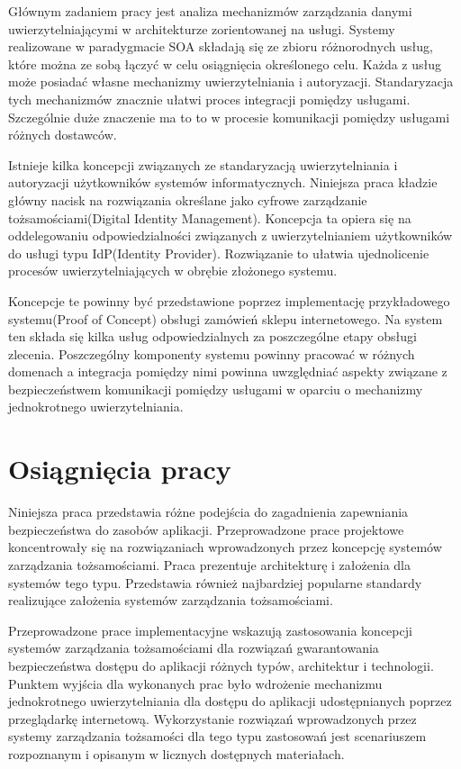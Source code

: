 	Głównym zadaniem pracy jest analiza mechanizmów zarządzania danymi uwierzytelniającymi w architekturze zorientowanej na usługi. Systemy realizowane w paradygmacie SOA składają się ze zbioru różnorodnych usług, które można ze sobą łączyć w celu osiągnięcia określonego celu. Każda z usług może posiadać własne mechanizmy uwierzytelniania i autoryzacji. Standaryzacja tych mechanizmów znacznie ułatwi proces integracji pomiędzy usługami. Szczególnie duże znaczenie ma to to w procesie komunikacji pomiędzy usługami różnych dostawców. 

	Istnieje kilka koncepcji związanych ze standaryzacją uwierzytelniania i autoryzacji użytkowników systemów informatycznych. Niniejsza praca kładzie główny nacisk na rozwiązania określane jako cyfrowe zarządzanie tożsamościami(Digital Identity Management). Koncepcja ta opiera się na oddelegowaniu odpowiedzialności związanych z uwierzytelnianiem użytkowników do usługi typu IdP(Identity Provider). Rozwiązanie to ułatwia ujednolicenie procesów uwierzytelniających w obrębie złożonego systemu.

	Koncepcje te powinny być przedstawione poprzez implementację przykładowego systemu(Proof of Concept) obsługi zamówień sklepu internetowego. Na system ten składa się kilka usług odpowiedzialnych za poszczególne etapy obsługi zlecenia. Poszczególny komponenty systemu powinny pracować w różnych domenach a integracja pomiędzy nimi powinna uwzględniać aspekty związane z bezpieczeństwem komunikacji pomiędzy usługami w oparciu o mechanizmy jednokrotnego uwierzytelniania.


\section{Osiągnięcia pracy}
\label{sec:osiagnieciaPracy}

	Niniejsza praca przedstawia różne podejścia do zagadnienia zapewniania bezpieczeństwa do zasobów aplikacji. Przeprowadzone prace projektowe koncentrowały się na rozwiązaniach wprowadzonych przez koncepcję systemów zarządzania tożsamościami. Praca prezentuje architekturę i założenia dla systemów tego typu. Przedstawia również najbardziej popularne standardy realizujące założenia systemów zarządzania tożsamościami.

	Przeprowadzone prace implementacyjne wskazują zastosowania koncepcji systemów zarządzania tożsamościami dla rozwiązań gwarantowania bezpieczeństwa dostępu do aplikacji różnych typów, architektur i technologii. Punktem wyjścia dla wykonanych prac było wdrożenie mechanizmu jednokrotnego uwierzytelniania dla dostępu do aplikacji udostępnianych poprzez przeglądarkę internetową. Wykorzystanie rozwiązań wprowadzonych przez systemy zarządzania tożsamości dla tego typu zastosowań jest scenariuszem rozpoznanym i opisanym w licznych dostępnych materiałach.

